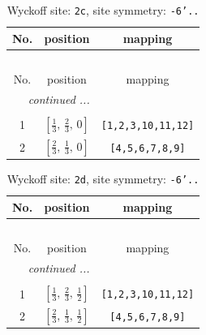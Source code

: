 \documentclass[fleqn,8pt]{jsarticle}
\begin{document}
\begin{longtable}{ccc}
\caption{Wyckoff site: {\tt 2c}, site symmetry: {\tt -6'..}}
 \\
 \hline \hline
No. & position & mapping \\ \hline \endfirsthead

\multicolumn{2}{l}{\tablename\ \thetable{}} \\
 \hline \hline
No. & position & mapping \\ \hline \endhead

 \hline \hline
\multicolumn{2}{r}{\footnotesize\it continued ...} \\ \endfoot

 \hline \hline
\multicolumn{2}{r}{} \\ \endlastfoot

1 & $\left[ \frac{1}{3},\, \frac{2}{3},\, 0 \right]$ & {\tt [1,2,3,10,11,12]} \\ \hline
2 & $\left[ \frac{2}{3},\, \frac{1}{3},\, 0 \right]$ & {\tt [4,5,6,7,8,9]} \\
\end{longtable}
\renewcommand{\arraystretch}{1.2}
\begin{longtable}{ccc}
\caption{Wyckoff site: {\tt 2d}, site symmetry: {\tt -6'..}}
 \\
 \hline \hline
No. & position & mapping \\ \hline \endfirsthead

\multicolumn{2}{l}{\tablename\ \thetable{}} \\
 \hline \hline
No. & position & mapping \\ \hline \endhead

 \hline \hline
\multicolumn{2}{r}{\footnotesize\it continued ...} \\ \endfoot

 \hline \hline
\multicolumn{2}{r}{} \\ \endlastfoot

1 & $\left[ \frac{1}{3},\, \frac{2}{3},\, \frac{1}{2} \right]$ & {\tt [1,2,3,10,11,12]} \\ \hline
2 & $\left[ \frac{2}{3},\, \frac{1}{3},\, \frac{1}{2} \right]$ & {\tt [4,5,6,7,8,9]} \\
\end{longtable}
\renewcommand{\arraystretch}{1.2}
\end{document}
